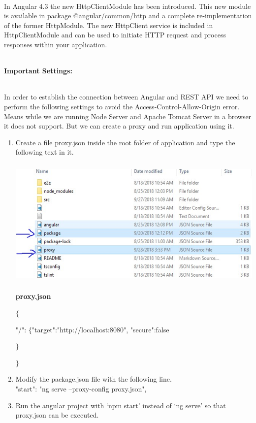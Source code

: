 \documentclass{article}
\begin{document}
 

\noindent \\ In Angular 4.3 the new HttpClientModule has been introduced. This new module is available in package @angular/common/http and a complete re-implementation of the former HttpModule. The new HttpClient service is included in HttpClientModule and can be used to initiate HTTP request  and process responses within your application.

\noindent 

\noindent \\ \textbf{Important Settings:}

\noindent 

\noindent \\ In order to establish the connection between Angular and REST API we need to perform the following settings to avoid the Access-Control-Allow-Origin error. Means while we are running Node Server and Apache Tomcat Server in a browser it does not support. But we can create a proxy and run application using it.

\noindent 

\begin{enumerate}
	\item Create a file proxy.json inside the root folder of application and type the following text in it.
	 
\begin{center}
		\includegraphics*[width=5.46in, height=2.51in]{IMG-06-01}   
\end{center}
	

	
	
	\noindent \textbf{proxy.json}
	
	\noindent $\mathrm{\{}$
	
	\noindent "/": $\mathrm{\{}$"target":"http://localhost:8080", "secure":false
	
	\noindent $\mathrm{\}}$
	
	\noindent $\mathrm{\}}$
	
	\item Modify the package.json file with the following line. \\ "start": "ng serve --proxy-config proxy.json",
	
	\item Run the angular project with `npm start' instead of `ng serve' so that proxy.json can be executed.
	
\end{enumerate}
      
\end{document}
